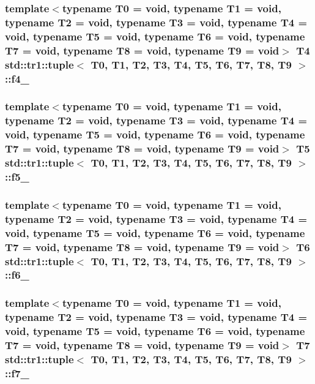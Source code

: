 \hypertarget{classstd_1_1tr1_1_1tuple_a893ccbbb34a262058b4cfa5020bbf84e}{
\subsubsection[{f4\-\_\-}]{\setlength{\rightskip}{0pt plus 5cm}template$<$typename T0 = void, typename T1 = void, typename T2 = void, typename T3 = void, typename T4 = void, typename T5 = void, typename T6 = void, typename T7 = void, typename T8 = void, typename T9 = void$>$ T4 {\bf std\-::tr1\-::tuple}$<$ T0, T1, T2, T3, T4, T5, T6, T7, T8, T9 $>$\-::f4\-\_\-}}\label{classstd_1_1tr1_1_1tuple_a893ccbbb34a262058b4cfa5020bbf84e}
\hypertarget{classstd_1_1tr1_1_1tuple_a1fbe806ede11f6e48aff17ce5c7b96a8}{
\subsubsection[{f5\-\_\-}]{\setlength{\rightskip}{0pt plus 5cm}template$<$typename T0 = void, typename T1 = void, typename T2 = void, typename T3 = void, typename T4 = void, typename T5 = void, typename T6 = void, typename T7 = void, typename T8 = void, typename T9 = void$>$ T5 {\bf std\-::tr1\-::tuple}$<$ T0, T1, T2, T3, T4, T5, T6, T7, T8, T9 $>$\-::f5\-\_\-}}\label{classstd_1_1tr1_1_1tuple_a1fbe806ede11f6e48aff17ce5c7b96a8}
\hypertarget{classstd_1_1tr1_1_1tuple_a1b7ddbc9893546b3028ee8f4543534cc}{
\subsubsection[{f6\-\_\-}]{\setlength{\rightskip}{0pt plus 5cm}template$<$typename T0 = void, typename T1 = void, typename T2 = void, typename T3 = void, typename T4 = void, typename T5 = void, typename T6 = void, typename T7 = void, typename T8 = void, typename T9 = void$>$ T6 {\bf std\-::tr1\-::tuple}$<$ T0, T1, T2, T3, T4, T5, T6, T7, T8, T9 $>$\-::f6\-\_\-}}\label{classstd_1_1tr1_1_1tuple_a1b7ddbc9893546b3028ee8f4543534cc}
\hypertarget{classstd_1_1tr1_1_1tuple_a254d543fc3669d5cbd41d5da833b9492}{
\subsubsection[{f7\-\_\-}]{\setlength{\rightskip}{0pt plus 5cm}template$<$typename T0 = void, typename T1 = void, typename T2 = void, typename T3 = void, typename T4 = void, typename T5 = void, typename T6 = void, typename T7 = void, typename T8 = void, typename T9 = void$>$ T7 {\bf std\-::tr1\-::tuple}$<$ T0, T1, T2, T3, T4, T5, T6, T7, T8, T9 $>$\-::f7\-\_\-}}\label{classstd_1_1tr1_1_1tuple_a254d543fc3669d5cbd41d5da833b9492}
